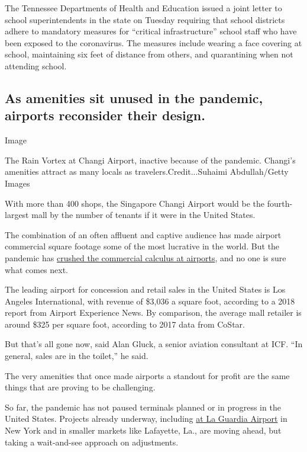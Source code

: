 The Tennessee Departments of Health and Education issued a joint letter
to school superintendents in the state on Tuesday requiring that school
districts adhere to mandatory measures for ``critical infrastructure''
school staff who have been exposed to the coronavirus. The measures
include wearing a face covering at school, maintaining six feet of
distance from others, and quarantining when not attending school.

\hypertarget{as-amenities-sit-unused-in-the-pandemic-airports-reconsider-their-design}{%
\subsection{As amenities sit unused in the pandemic, airports reconsider
their
design.}\label{as-amenities-sit-unused-in-the-pandemic-airports-reconsider-their-design}}

Image

The Rain Vortex at Changi Airport, inactive because of the pandemic.
Changi's amenities attract as many locals as travelers.Credit...Suhaimi
Abdullah/Getty Images

With more than 400 shops, the Singapore Changi Airport would be the
fourth-largest mall by the number of tenants if it were in the United
States.

The combination of an often affluent and captive audience has made
airport commercial square footage some of the most lucrative in the
world. But the pandemic has
\href{https://www.nytimes3xbfgragh.onion/2020/08/18/business/airport-remodeling-coronavirus-safety.html}{crushed
the commercial calculus at airports}, and no one is sure what comes
next.

The leading airport for concession and retail sales in the United States
is Los Angeles International, with revenue of \$3,036 a square foot,
according to a 2018 report from Airport Experience News. By comparison,
the average mall retailer is around \$325 per square foot, according to
2017 data from CoStar.

But that's all gone now, said Alan Gluck, a senior aviation consultant
at ICF. ``In general, sales are in the toilet,'' he said.

The very amenities that once made airports a standout for profit are the
same things that are proving to be challenging.

So far, the pandemic has not paused terminals planned or in progress in
the United States. Projects already underway, including
\href{https://www.nytimes3xbfgragh.onion/2020/06/10/nyregion/new-la-guardia-airport-terminal.html}{at
La Guardia Airport} in New York and in smaller markets like Lafayette,
La., are moving ahead, but taking a wait-and-see approach on
adjustments.

